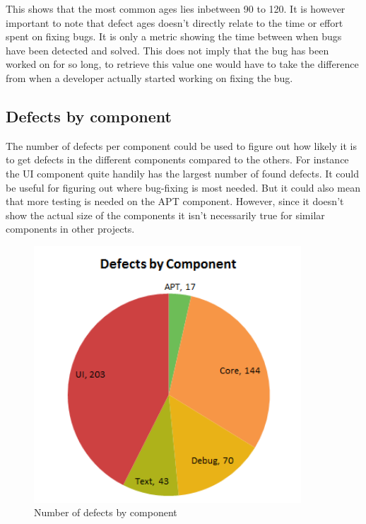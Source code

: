 \documentclass{article}
\begin{document}
This shows that the most common ages lies inbetween 90 to 120.
It is however important to note that defect ages doesn't directly relate to the time or effort spent on fixing bugs.
It is only a metric showing the time between when bugs have been detected and solved.
This does not imply that the bug has been worked on for so long, to retrieve this value one would have to take the difference from when a developer actually started working on fixing the bug.

\subsection{Defects by component}
The number of defects per component could be used to figure out how likely it is to get defects in the different components compared to the others.
For instance the UI component quite handily has the largest number of found defects. It could be useful for figuring out where bug-fixing is most needed. But it could also mean that more testing is needed on the APT component.
However, since it doesn't show the actual size of the components it isn't necessarily true for similar components in other projects.
\begin{figure}[H]
\center
\includegraphics[width=100mm]{defects_by_component.png}
\caption{Number of defects by component}
\end{figure}
\end{document}
